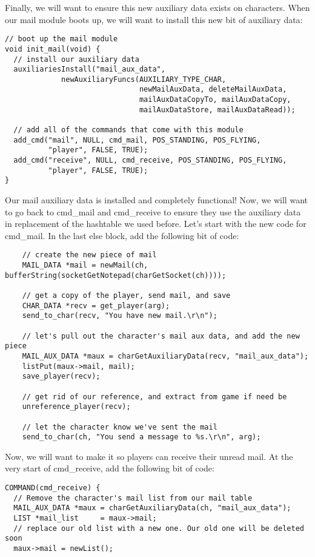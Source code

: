 \documentclass[12pt]{article}
\begin{document}
Finally, we will want to ensure this new auxiliary data exists on characters. When our mail module boots up, we will want to install this new bit of auxiliary data:

{\bf \begin{verbatim}
// boot up the mail module
void init_mail(void) {
  // install our auxiliary data
  auxiliariesInstall("mail_aux_data",
		     newAuxiliaryFuncs(AUXILIARY_TYPE_CHAR,
                               newMailAuxData, deleteMailAuxData,
                               mailAuxDataCopyTo, mailAuxDataCopy,
                               mailAuxDataStore, mailAuxDataRead));
  
  // add all of the commands that come with this module
  add_cmd("mail", NULL, cmd_mail, POS_STANDING, POS_FLYING,
          "player", FALSE, TRUE);
  add_cmd("receive", NULL, cmd_receive, POS_STANDING, POS_FLYING,
          "player", FALSE, TRUE);
}
\end{verbatim}}

Our mail auxiliary data is installed and completely functional! Now, we will want to go back to cmd\_mail and cmd\_receive to ensure they use the auxiliary data in replacement of the hashtable we used before. Let's start with the new code for cmd\_mail. In the last else block, add the following bit of code:

{\bf \begin{verbatim}
    // create the new piece of mail
    MAIL_DATA *mail = newMail(ch, bufferString(socketGetNotepad(charGetSocket(ch))));

    // get a copy of the player, send mail, and save
    CHAR_DATA *recv = get_player(arg);
    send_to_char(recv, "You have new mail.\r\n");
    
    // let's pull out the character's mail aux data, and add the new piece
    MAIL_AUX_DATA *maux = charGetAuxiliaryData(recv, "mail_aux_data");
    listPut(maux->mail, mail);
    save_player(recv);
      
    // get rid of our reference, and extract from game if need be
    unreference_player(recv);      

    // let the character know we've sent the mail
    send_to_char(ch, "You send a message to %s.\r\n", arg);
\end{verbatim}}

Now, we will want to make it so players can receive their unread mail. At the very start of cmd\_receive, add the following bit of code:
{\bf \begin{verbatim}
COMMAND(cmd_receive) {
  // Remove the character's mail list from our mail table
  MAIL_AUX_DATA *maux = charGetAuxiliaryData(ch, "mail_aux_data");
  LIST *mail_list     = maux->mail;
  // replace our old list with a new one. Our old one will be deleted soon
  maux->mail = newList();
\end{verbatim}}
\end{document}
